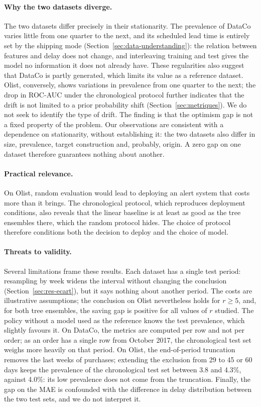 \documentclass[11pt,a4paper]{article}
\theoremstyle{definition}
\begin{document}
\paragraph{Why the two datasets diverge.} The two datasets differ precisely in their stationarity. The prevalence of DataCo varies little from one quarter to the next, and its scheduled lead time is entirely set by the shipping mode (Section~\ref{sec:data-understanding}): the relation between features and delay does not change, and interleaving training and test gives the model no information it does not already have. These regularities also suggest that DataCo is partly generated, which limits its value as a reference dataset. Olist, conversely, shows variations in prevalence from one quarter to the next; the drop in ROC-AUC under the chronological protocol further indicates that the drift is not limited to a prior probability shift (Section~\ref{sec:metriques}). We do not seek to identify the type of drift. The finding is that the optimism gap is not a fixed property of the problem. Our observations are consistent with a dependence on stationarity, without establishing it: the two datasets also differ in size, prevalence, target construction and, probably, origin. A zero gap on one dataset therefore guarantees nothing about another.

\paragraph{Practical relevance.} On Olist, random evaluation would lead to deploying an alert system that costs more than it brings. The chronological protocol, which reproduces deployment conditions, also reveals that the linear baseline is at least as good as the tree ensembles there, which the random protocol hides. The choice of protocol therefore conditions both the decision to deploy and the choice of model.

\paragraph{Threats to validity.} Several limitations frame these results. Each dataset has a single test period: resampling by week widens the interval without changing the conclusion (Section~\ref{sec:res-ecart}), but it says nothing about another period. The costs are illustrative assumptions; the conclusion on Olist nevertheless holds for $r \ge 5$, and, for both tree ensembles, the saving gap is positive for all values of $r$ studied. The policy without a model used as the reference knows the test prevalence, which slightly favours it. On DataCo, the metrics are computed per row and not per order; as an order has a single row from October 2017, the chronological test set weighs more heavily on that period. On Olist, the end-of-period truncation removes the last weeks of purchases; extending the exclusion from 29 to 45 or 60 days keeps the prevalence of the chronological test set between 3.8 and 4.3\%, against 4.0\%: its low prevalence does not come from the truncation. Finally, the gap on the MAE is confounded with the difference in delay distribution between the two test sets, and we do not interpret it.
\end{document}

